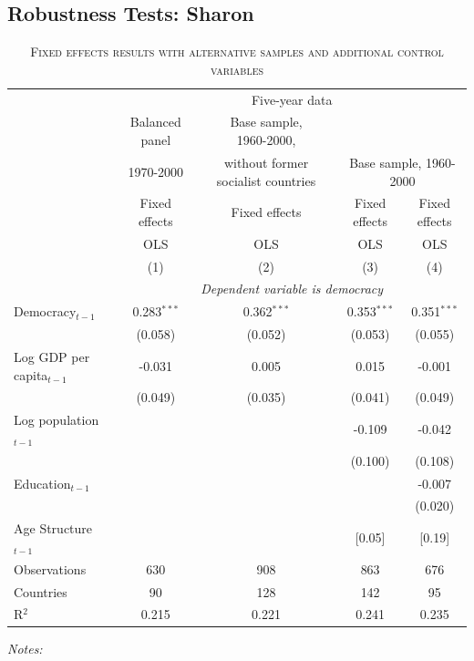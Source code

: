 \subsection{Robustness Tests: Sharon}
\begin{table}[h!] \centering
	\begin{adjustbox}{max width=\textwidth}
		\begin{threeparttable}
			\caption{\textsc{Fixed effects results with alternative samples and additional control variables}}			
			\begin{tabular}{l*{6}{c}} 
			\hline\hline
			& \multicolumn{6}{c}{Five-year data}\\
            \cline{2-7}
			&Balanced panel &&Base sample, 1960-2000, &&&\\[-1.8ex] 
			&1970-2000 &&without former socialist countries  & &\multicolumn{2}{c}{Base sample, 1960-2000}\\
			\cline{2-2} \cline{4-4} \cline{6-7} 
			&Fixed effects &&Fixed effects &&Fixed effects &Fixed effects \\[-1.8ex] 	
			&OLS &&OLS &&OLS&OLS \\[-1.8ex] 			 
&\multicolumn{1}{c}{(1)} &&\multicolumn{1}{c}{(2)} &&\multicolumn{1}{c}{(3)}&\multicolumn{1}{c}{(4)} \\ 
\hline				
&\multicolumn{6}{c}{\textit{Dependent variable is democracy}}\\	
\cline{2-7}	
Democracy$_{t-1}$ & 0.283$^{***}$ && 0.362$^{***}$ && 0.353$^{***}$ & 0.351$^{***}$ \\ [-1.8ex]
& (0.058) && (0.052) && (0.053) & (0.055) \\ 
Log GDP per capita$_{t-1}$ & -0.031 && 0.005 && 0.015 & -0.001 \\ 
& (0.049) && (0.035) && (0.041) & (0.049) \\[-1.8ex] 
Log population$_{t-1}$ &  &&  && -0.109 & -0.042 \\ 
&  &&  && (0.100) & (0.108) \\ 
Education$_{t-1}$ &  &&  &&  & -0.007 \\ [-1.8ex]
&  &&  &&  & (0.020) \\ 
Age Structure$_{t-1}$ &  &&  && [0.05] & [0.19] \\
Observations & \multicolumn{1}{c}{630} && \multicolumn{1}{c}{908} && \multicolumn{1}{c}{863} & \multicolumn{1}{c}{676} \\[-1.8ex]
Countries &90 &&128 &&142 &95\\[-1.8ex] 
R$^{2}$ & \multicolumn{1}{c}{0.215} && \multicolumn{1}{c}{0.221} && \multicolumn{1}{c}{0.241} & \multicolumn{1}{c}{0.235} \\ 
\hline
\end{tabular}
\begin{tablenotes}
	\item \textit{Notes:} 
\end{tablenotes}
\end{threeparttable}	
\end{adjustbox}
\end{table}

